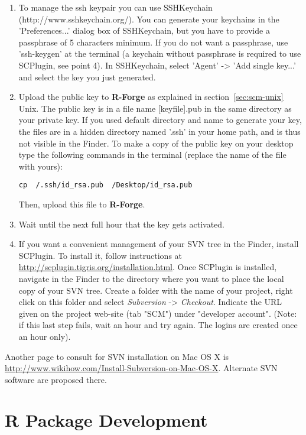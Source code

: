 \documentclass[a4paper]{report}
\let\code=\texttt
\begin{document}
\begin{enumerate}
\item To manage the ssh keypair you can use SSHKeychain
(http://www.sshkeychain.org/). You can generate your keychains in the
'Preferences...' dialog box of SSHKeychain, but you have to provide a
passphrase of 5 characters minimum. If you do not want a passphrase,
use 'ssh-keygen' at the terminal (a keychain without passphrase is
required to use SCPlugin, see point 4). In SSHKeychain, select 'Agent'
-> 'Add single key...' and select the key you just generated. 

\item Upload the public key to \textbf{R-Forge} as explained in
  section~\ref{sec:scm-unix}
  Unix. The public key is in a file name [keyfile].pub in the same
  directory as your private key. If you used default directory and
  name to generate your key, the files are in a hidden directory named
  '.ssh' in your home path, and is thus not visible in the Finder. To
  make a copy of the public key on your desktop type the following
  commands in the terminal (replace the name of the file with yours): 

  \code{cp ~/.ssh/id\_rsa.pub ~/Desktop/id\_rsa.pub}
  
  Then, upload this file to \textbf{R-Forge}.

\item Wait until the next full hour that the key gets activated.

\item If you want a convenient management of your SVN tree in the
  Finder, install SCPlugin. To install it, follow instructions at
  \url{http://scplugin.tigris.org/installation.html}. Once SCPlugin is
  installed, navigate in the Finder to the directory where you want to
  place the local copy of your SVN tree. Create a folder with the name
  of your project, right click on this folder and select \textit{Subversion}
  -> \textit{Checkout}. Indicate the URL given on the project web-site (tab
  "SCM") under "developer account". (Note: if this last step fails,
  wait an hour and try again. The logins are created once an hour
  only). 

\end{enumerate}

Another page to consult for SVN installation on Mac OS X is
\url{http://www.wikihow.com/Install-Subversion-on-Mac-OS-X}. Alternate SVN
software are proposed there. 

\section{R Package Development}
\end{document}
